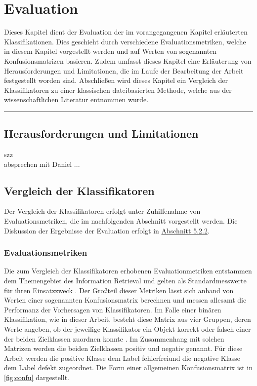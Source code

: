 
\chapter{Evaluation}
\label{evaluation}

Dieses Kapitel dient der Evaluation der im vorangegangenen Kapitel erläuterten Klassifikationen. Dies geschieht durch verschiedene Evaluationsmetriken, welche in diesem Kapitel vorgestellt werden und auf Werten von sogenannten Konfusionsmatrizen basieren. Zudem umfasst dieses Kapitel eine Erläuterung von Herausforderungen und Limitationen, die im Laufe der Bearbeitung der Arbeit festgestellt worden sind. Abschließen wird dieses Kapitel ein Vergleich der Klassifikatoren zu einer klassischen dateibasierten Methode, welche aus der wissenschaftlichen Literatur entnommen wurde.
\\
\hrule

\section{Herausforderungen und Limitationen}

szz \\
absprechen mit Daniel
...

\section{Vergleich der Klassifikatoren}

Der Vergleich der Klassifikatoren erfolgt unter Zuhilfenahme von Evaluationsmetriken, die im nachfolgenden Abschnitt vorgestellt werden. Die Diskussion der Ergebnisse der Evaluation erfolgt in \hyperref[results]{Abschnitt 5.2.2}.

\subsection{Evaluationsmetriken}
\label{eval-metrics}

Die zum Vergleich der Klassifikatoren erhobenen Evaluationmetriken entstammen dem Themengebiet des Information Retrieval und gelten als Standardmesswerte für ihren Einsatzzweck \cite{Sammut2017}. Der Großteil dieser Metriken lässt sich anhand von Werten einer sogenannten Konfusionsmatrix berechnen und messen allesamt die Performanz der Vorhersagen von Klassifikatoren. Im Falle einer binären Klassifikation, wie in dieser Arbeit, besteht diese Matrix aus vier Gruppen, deren Werte angeben, ob der jeweilige Klassifikator ein Objekt korrekt oder falsch einer der beiden Zielklassen zuordnen konnte \cite{Sammut2017}. Im Zusammenhang mit solchen Matrizen werden die beiden Zielklassen \glqq positiv\grqq{} und \glqq negativ\grqq{} genannt. Für diese Arbeit werden die positive Klasse dem Label \glqq fehlerfrei\grqq und die negative Klasse dem Label \glqq defekt\grqq{} zugeordnet. Die Form einer allgemeinen Konfusionsmatrix ist in \autoref{fig:confu} dargestellt.

